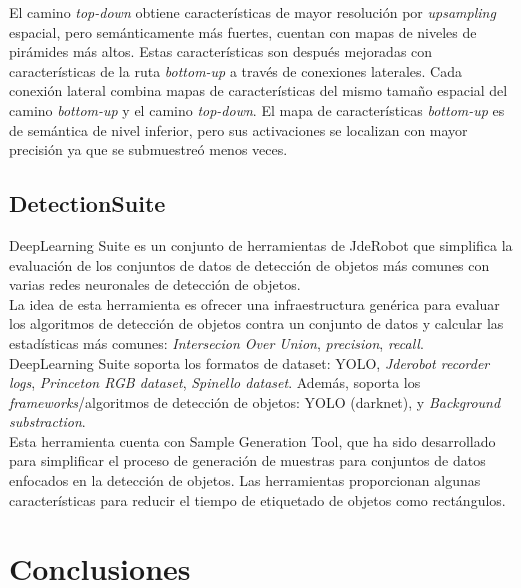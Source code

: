 \documentclass{bmvc2k}
\begin{document}
El camino \textit{top-down} obtiene características de mayor resolución por \textit{upsampling} espacial, pero semánticamente más fuertes, cuentan con mapas de niveles de pirámides más altos. Estas características son después mejoradas con características de la ruta \textit{bottom-up} a través de conexiones laterales. Cada conexión lateral combina mapas de características del mismo tamaño espacial del camino \textit{bottom-up} y el camino \textit{top-down}. El mapa de características \textit{bottom-up} es de semántica de nivel inferior, pero sus activaciones se localizan con mayor precisión ya que se submuestreó menos veces.\\

\subsection{DetectionSuite}

DeepLearning Suite es un conjunto de herramientas de JdeRobot que simplifica la evaluación de los conjuntos de datos de detección de objetos más comunes con varias redes neuronales de detección de objetos.\\

La idea de esta herramienta es ofrecer una infraestructura genérica para evaluar los algoritmos de detección de objetos contra un conjunto de datos y calcular las estadísticas más comunes: \textit{Intersecion Over Union}, \textit{precision}, \textit{recall}.\\

DeepLearning Suite soporta los formatos de dataset: YOLO, \textit{Jderobot recorder logs}, \textit{Princeton RGB dataset}, \textit{Spinello dataset}. Además, soporta los \textit{frameworks}/algoritmos de detección de objetos: YOLO (darknet), y \textit{Background substraction}.\\

Esta herramienta cuenta con Sample Generation Tool, que ha sido desarrollado para simplificar el proceso de generación de muestras para conjuntos de datos enfocados en la detección de objetos. Las herramientas proporcionan algunas características para reducir el tiempo de etiquetado de objetos como rectángulos.\\


\section{Conclusiones}
\end{document}
